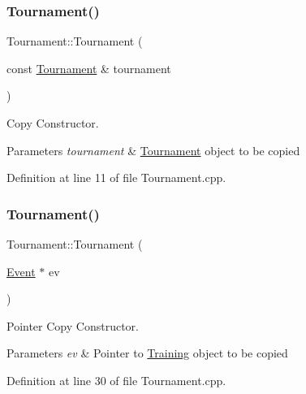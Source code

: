 \subsubsection{\texorpdfstring{Tournament()}{Tournament()}\hspace{0.1cm}{\footnotesize\ttfamily [2/4]}}
{\footnotesize\ttfamily Tournament\+::\+Tournament (\begin{DoxyParamCaption}\item[{const \hyperlink{class_tournament}{Tournament} \&}]{tournament }\end{DoxyParamCaption})}



Copy Constructor. 


\begin{DoxyParams}{Parameters}
{\em tournament} & \hyperlink{class_tournament}{Tournament} object to be copied \\
\hline
\end{DoxyParams}


Definition at line 11 of file Tournament.\+cpp.

\hypertarget{class_tournament_a38dbc53e1d0f1eaf6b661169db87c270}{}\label{class_tournament_a38dbc53e1d0f1eaf6b661169db87c270} 
\subsubsection{\texorpdfstring{Tournament()}{Tournament()}\hspace{0.1cm}{\footnotesize\ttfamily [3/4]}}
{\footnotesize\ttfamily Tournament\+::\+Tournament (\begin{DoxyParamCaption}\item[{\hyperlink{class_event}{Event} $\ast$}]{ev }\end{DoxyParamCaption})}



Pointer Copy Constructor. 


\begin{DoxyParams}{Parameters}
{\em ev} & Pointer to \hyperlink{class_training}{Training} object to be copied \\
\hline
\end{DoxyParams}


Definition at line 30 of file Tournament.\+cpp.

\hypertarget{class_tournament_a84c5301c50e0c4ac263ed3d74fa7c8c5}{}\label{class_tournament_a84c5301c50e0c4ac263ed3d74fa7c8c5} 
